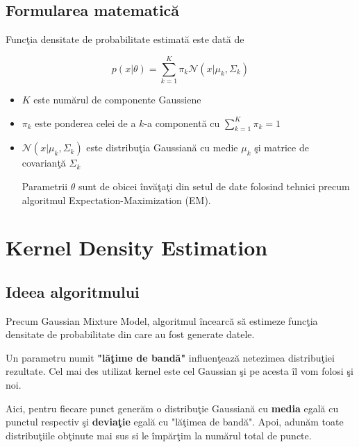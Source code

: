 \subsection{Formularea matematică}

Funcţia densitate de probabilitate estimată este dată de 

\begin{equation}
    p(x | \theta) = \sum_{k=1}^{K} \pi_k \mathcal{N}(x | \mu_k, \Sigma_k)
    \end{equation}
    
    \begin{itemize}
        \item $K$ este numărul de componente Gaussiene
        \item $\pi_k$ este ponderea celei de a $k$-a componentă cu $\sum_{k=1}^{K} \pi_k = 1$
        \item $\mathcal{N}(x | \mu_k, \Sigma_k)$ este distribuţia Gaussiană
        cu medie $\mu_k$ şi matrice de covarianţă $\Sigma_k$
    
    Parametrii $\theta$ sunt de obicei învăţaţi din setul de date folosind 
    tehnici precum algoritmul Expectation-Maximization (EM).
    \end{itemize}

\section{Kernel Density Estimation}

\subsection{Ideea algoritmului}

Precum Gaussian Mixture Model, algoritmul încearcă să estimeze 
funcţia densitate de probabilitate din care au fost generate datele.

Un parametru numit \textbf{"lăţime de bandă"} influenţează netezimea distribuţiei 
rezultate.
Cel mai des utilizat kernel este cel Gaussian şi pe acesta îl vom folosi şi noi.

Aici, pentru fiecare punct generăm o distribuţie Gaussiană cu \textbf{media} egală
cu punctul respectiv şi \textbf{deviaţie} egală cu "lăţimea de bandă". Apoi, adunăm toate 
distribuţiile obţinute mai sus si le împărţim la numărul total de puncte.

